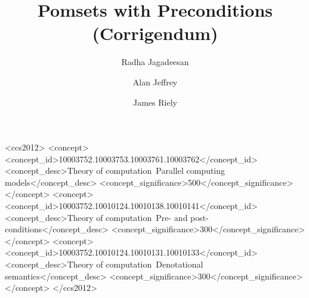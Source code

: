 \documentclass[acmsmall,screen]{acmart}\settopmatter{printfolios=true}
\theoremstyle{acmdefinition}
\begin{document}
\title{Pomsets with Preconditions (Corrigendum)}
\author{Radha Jagadeesan}

\author{Alan Jeffrey}

\author{James Riely}

\begin{abstract}

\end{abstract}

\begin{CCSXML}
<ccs2012>
   <concept>
       <concept_id>10003752.10003753.10003761.10003762</concept_id>
       <concept_desc>Theory of computation~Parallel computing models</concept_desc>
       <concept_significance>500</concept_significance>
       </concept>
   <concept>
       <concept_id>10003752.10010124.10010138.10010141</concept_id>
       <concept_desc>Theory of computation~Pre- and post-conditions</concept_desc>
       <concept_significance>300</concept_significance>
       </concept>
   <concept>
       <concept_id>10003752.10010124.10010131.10010133</concept_id>
       <concept_desc>Theory of computation~Denotational semantics</concept_desc>
       <concept_significance>300</concept_significance>
       </concept>
 </ccs2012>
\end{CCSXML}

\maketitle








\clearpage

\appendix


\end{document}
